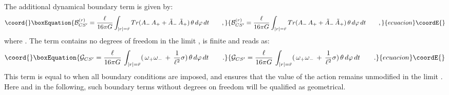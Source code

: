 \documentclass[a4paper,10pt]{article}
\begin{document}
The additional dynamical boundary term \coordHE{}  
is given by: 
\begin{equation}\coord{}\boxEquation{ 
{\cal B}_{CS'}^{(r)} 
=  \frac {\ell} {16 \pi G} \int_{|r|=\bar r}   
Tr (  A_{-} \,  A_{+} + \tilde A_{-} \,  \tilde A_{+}) \,  
\theta \, d\varphi\, dt  \qquad ,
}{ 
{\cal B}_{CS'}^{(r)} 
=  \frac {\ell} {16 \pi G} \int_{|r|=\bar r}   
Tr (  A_{-} \,  A_{+} + \tilde A_{-} \,  \tilde A_{+}) \,  
\theta \, d\varphi\, dt  \qquad ,
}{ecuacion}\coordE{}\end{equation} 
where  
\coordHE{}.
The \coordHE{} term contains no degrees of 
freedom in the limit \coordHE{}, 
is finite and reads as: 
\begin{equation}\coord{}\boxEquation{ 
\label{GCS} 
{\cal G}_{CS'} = \frac {\ell} {16 \pi G}\,\int_{|r|=\bar r}  
  (\, \omega_{+}\omega_{-}  
 \, + \, 
 \frac 1 {\ell^2} \sigma ) \, \theta \, d\varphi\, dt \qquad . 
}{ 
{\cal G}_{CS'} = \frac {\ell} {16 \pi G}\,\int_{|r|=\bar r}  
  (\, \omega_{+}\omega_{-}  
 \, + \, 
 \frac 1 {\ell^2} \sigma ) \, \theta \, d\varphi\, dt \qquad . 
}{ecuacion}\coordE{}\end{equation} 
This term is equal to \coordHE{} when all  
boundary conditions are imposed, and ensures that the value of the action \coordHE{} 
remains unmodified in the limit 
\coordHE{}. 
Here and in the following, such boundary terms without degrees on freedom 
will be qualified as geometrical. 
   
\end{document}

